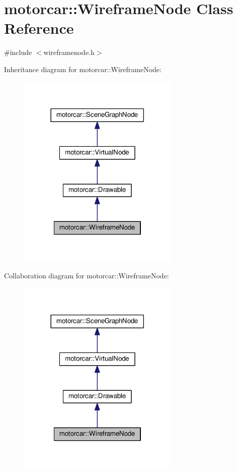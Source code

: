 \hypertarget{classmotorcar_1_1WireframeNode}{\section{motorcar\-:\-:Wireframe\-Node Class Reference}
\label{classmotorcar_1_1WireframeNode}
}


{\ttfamily \#include $<$wireframenode.\-h$>$}



Inheritance diagram for motorcar\-:\-:Wireframe\-Node\-:
\nopagebreak
\begin{figure}[H]
\begin{center}
\leavevmode
\includegraphics[width=218pt]{classmotorcar_1_1WireframeNode__inherit__graph}
\end{center}
\end{figure}


Collaboration diagram for motorcar\-:\-:Wireframe\-Node\-:
\nopagebreak
\begin{figure}[H]
\begin{center}
\leavevmode
\includegraphics[width=218pt]{classmotorcar_1_1WireframeNode__coll__graph}
\end{center}
\end{figure}
